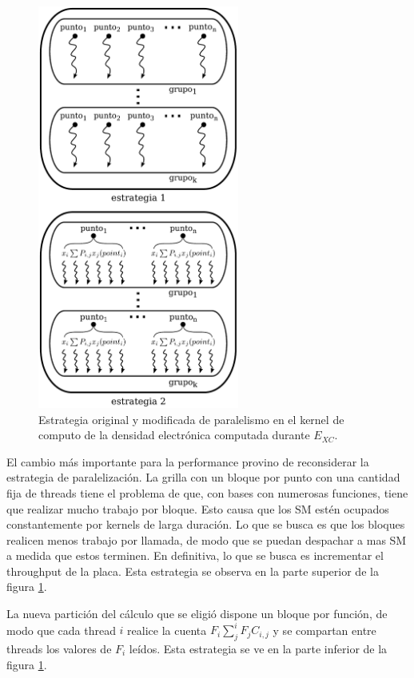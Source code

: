 \begin{figure}[htbp]
   \centering
   \includegraphics[width=250px]{images/cuda-parallelism.pdf}
   \caption{Estrategia original y modificada de paralelismo en el kernel de computo de la densidad
   electr\'onica computada durante $E_{XC}$.}
   \label{fig:cuda-xc-parallelism}
\end{figure}

El cambio m\'as importante para la performance provino de reconsiderar
la estrategia de paralelizaci\'on. La grilla con un bloque por punto con una cantidad
fija de threads tiene el problema de que, con bases con numerosas funciones, tiene que realizar
mucho trabajo por bloque. Esto causa que los SM est\'en ocupados constantemente
por kernels de larga duraci\'on. Lo que se busca es que los bloques realicen
menos trabajo por llamada, de modo que se puedan despachar a mas SM a medida
que estos terminen. En definitiva, lo que se busca es incrementar el throughput
de la placa. Esta estrategia se observa en la parte superior de la figura
\ref{fig:cuda-xc-parallelism}.

La nueva partici\'on del c\'alculo que se eligi\'o dispone un bloque por funci\'on,
de modo que cada thread $i$ realice la cuenta $F_i \sum_{j}^{i} F_j C_{i,j}$
y se compartan entre threads los valores de $F_i$ le\'idos.
Esta estrategia se ve en la parte inferior de la figura \ref{fig:cuda-xc-parallelism}.

